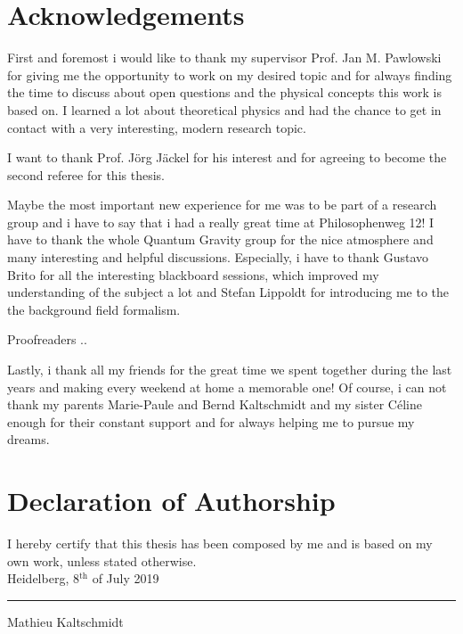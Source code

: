 \thispagestyle{plain}
\section*{Acknowledgements}
First and foremost i would like to thank my supervisor Prof. Jan M. Pawlowski for giving me the opportunity to work on my desired topic and for always finding the time to discuss about open questions and the physical concepts this work is based on. I learned a lot about theoretical physics and had the chance to get in contact with a very interesting, modern research topic. 

I want to thank Prof. J\"org J\"ackel for his interest and for agreeing to become the second referee for this thesis.

Maybe the most important new experience for me was to be part of a research group and i have to say that i had a really great time at Philosophenweg 12! I have to thank the whole Quantum Gravity group for the nice atmosphere and many interesting and helpful discussions.  Especially, i have to thank Gustavo Brito for all the interesting blackboard sessions, which improved  my understanding of the subject a lot and Stefan Lippoldt for introducing me  to the the background field formalism.

Proofreaders ..


Lastly, i thank all my friends for the great time we spent together during the last years and making every weekend at home a memorable one! Of course, i can not thank my parents Marie-Paule and Bernd Kaltschmidt and my sister C\'{e}line enough for their constant support and for always helping me to pursue my dreams.  
 

\section*{Declaration of Authorship}
I hereby certify that this thesis has been composed by me and is based on my own work, unless stated otherwise.\\

Heidelberg, 8$^{\mathrm{th}}$ of July 2019 \hfill \rule{60mm}{.15mm} \par \vspace{-0.4cm}
\hfill Mathieu Kaltschmidt

